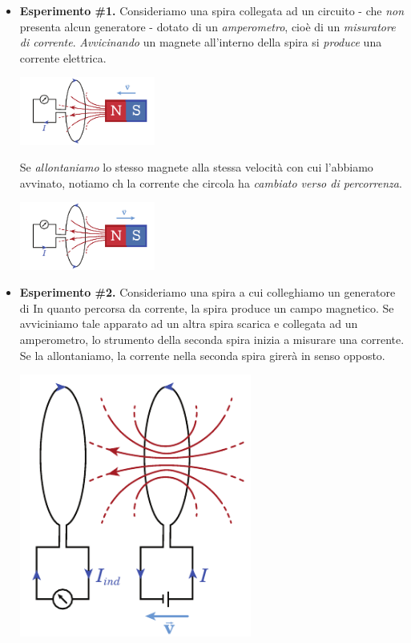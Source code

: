 \begin{itemize}
	\item \textbf{Esperimento \#1.} Consideriamo una spira collegata ad un circuito - che \textit{non} presenta alcun generatore - dotato di un \textit{amperometro}, cioè di un \textit{misuratore di corrente}. \textit{Avvicinando} un magnete all'interno della spira si \textit{produce} una corrente elettrica.
\begin{center}
	\includegraphics[width=0.35\textwidth]{images/chp10/chp10esperimento1a.pdf}
\end{center}
	Se \textit{allontaniamo} lo stesso magnete alla stessa velocità con cui l'abbiamo avvinato, notiamo ch la corrente che circola ha \textit{cambiato verso di percorrenza}.
\begin{center}
	\includegraphics[width=0.35\textwidth]{images/chp10/chp10esperimento1b.pdf}
\end{center}
	\item \textbf{Esperimento \#2.} Consideriamo una spira a cui colleghiamo un generatore di \fem In quanto percorsa da corrente, la spira produce un campo magnetico. Se avviciniamo tale apparato ad un altra spira scarica e collegata ad un amperometro, lo strumento della seconda spira inizia a misurare una corrente. Se la allontaniamo, la corrente nella seconda spira girerà in senso opposto.\\
	\begin{minipage}{0.49\textwidth}
		\begin{center}
			\includegraphics[width=0.6\textwidth]{images/chp10/chp10esperimento2a.pdf}

\end{center}
\end{minipage}
\end{itemize}

